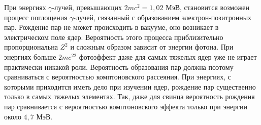 При энергиях $\gamma$-лучей, превышающих $2mc^2 = 1,02$ МэВ, становится
возможен процесс поглощения $\gamma$-лучей, связанный с образованием
электрон-позитронных пар. Рождение пар не может происходить в вакууме, оно
возникает в электрическом поле ядер. Вероятность этого процесса приблизительно
пропорциональна $Z^2$ и сложным образом зависит от энергии фотона. При
энергиях больше $2mc^22$ фотоэффект даже для самых тяжелых ядер уже не играет
практически никакой роли. Вероятность образования пар должна поэтому
сравниваться с вероятностью комптоновского рассеяния. При энергиях, с которыми
приходится иметь дело при изучении ядер, рождение пар существенно только в самых
тяжелых элементах. Так, даже для свинца вероятность рождения пар сравнивается с
вероятностью комптоновского эффекта только при энергии около $4,7$ МэВ.
